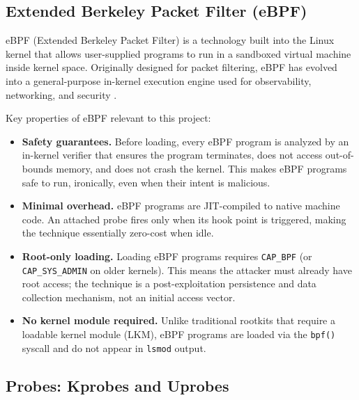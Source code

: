 \documentclass[11pt,a4paper]{article}
\begin{document}
\subsection{Extended Berkeley Packet Filter (eBPF)}
\label{subsec:ebpf}

eBPF (Extended Berkeley Packet Filter) is a technology built into the Linux
kernel that allows user-supplied programs to run in a sandboxed virtual machine
inside kernel space. Originally designed for packet filtering, eBPF has evolved
into a general-purpose in-kernel execution engine used for observability,
networking, and security \cite{gregg2019}.

Key properties of eBPF relevant to this project:

\begin{itemize}
    \item \textbf{Safety guarantees.} Before loading, every eBPF program is
          analyzed by an in-kernel verifier that ensures the program terminates,
          does not access out-of-bounds memory, and does not crash the kernel.
          This makes eBPF programs safe to run, ironically, even when their
          intent is malicious.
    \item \textbf{Minimal overhead.} eBPF programs are JIT-compiled to native
          machine code. An attached probe fires only when its hook point is
          triggered, making the technique essentially zero-cost when idle.
    \item \textbf{Root-only loading.} Loading eBPF programs requires
          \texttt{CAP\_BPF} (or \texttt{CAP\_SYS\_ADMIN} on older kernels).
          This means the attacker must already have root access; the technique
          is a post-exploitation persistence and data collection mechanism,
          not an initial access vector.
    \item \textbf{No kernel module required.} Unlike traditional rootkits that
          require a loadable kernel module (LKM), eBPF programs are loaded via
          the \texttt{bpf()} syscall and do not appear in \texttt{lsmod} output.
\end{itemize}

\subsection{Probes: Kprobes and Uprobes}
\label{subsec:probes}
\end{document}
